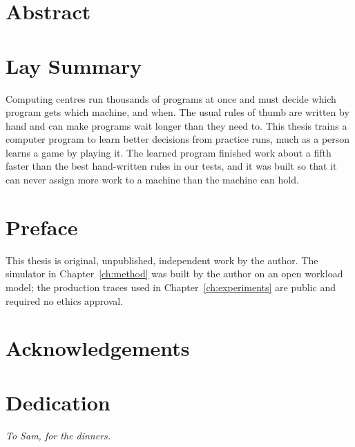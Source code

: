 \documentclass[12pt,oneside,openany]{report}
\begin{document}

\setcounter{page}{2}


\chapter*{Abstract}

\clearpage
\chapter*{Lay Summary}
Computing centres run thousands of programs at once and must decide which program gets which
machine, and when. The usual rules of thumb are written by hand and can make programs wait
longer than they need to. This thesis trains a computer program to learn better decisions from
practice runs, much as a person learns a game by playing it. The learned program finished work
about a fifth faster than the best hand-written rules in our tests, and it was built so that it
can never assign more work to a machine than the machine can hold.
\clearpage
\chapter*{Preface}
This thesis is original, unpublished, independent work by the author. The simulator in
Chapter~\ref{ch:method} was built by the author on an open workload model; the production
traces used in Chapter~\ref{ch:experiments} are public and required no ethics approval.
\clearpage
\tableofcontents
\listoftables
\listoffigures
\clearpage
\chapter*{Acknowledgements}

\clearpage
\chapter*{Dedication}
\begin{center}\itshape To Sam, for the dinners.\end{center}
\clearpage










\appendix

\end{document}
